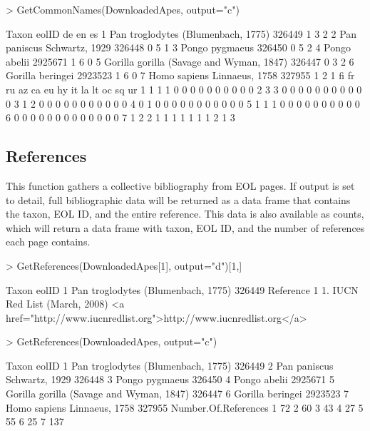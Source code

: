 \documentclass[12pt]{article}
\begin{document}
\begin{Schunk}
\begin{Sinput}
> GetCommonNames(DownloadedApes, output="c")
\end{Sinput}
\begin{Soutput}
                                     Taxon   eolID de en es
1       Pan troglodytes (Blumenbach, 1775)  326449  1  3  2
2              Pan paniscus Schwartz, 1929  326448  0  5  1
3                           Pongo pygmaeus  326450  0  5  2
4                             Pongo abelii 2925671  1  6  0
5 Gorilla gorilla (Savage and Wyman, 1847)  326447  0  3  2
6                         Gorilla beringei 2923523  1  6  0
7              Homo sapiens Linnaeus, 1758  327955  1  2  1
  fi fr ru az ca eu hy it la lt oc sq ur
1  1  1  1  0  0  0  0  0  0  0  0  0  0
2  3  3  0  0  0  0  0  0  0  0  0  0  0
3  1  2  0  0  0  0  0  0  0  0  0  0  0
4  0  1  0  0  0  0  0  0  0  0  0  0  0
5  1  1  1  0  0  0  0  0  0  0  0  0  0
6  0  0  0  0  0  0  0  0  0  0  0  0  0
7  1  2  2  1  1  1  1  1  1  1  2  1  3
\end{Soutput}
\end{Schunk}

\subsection{References}
This function gathers a collective bibliography from EOL pages. If output is set to detail, full bibliographic data will be returned as a data frame that contains the taxon, EOL ID, and the entire reference. This data is also available as counts, which will return a data frame with taxon, EOL ID, and the number of references each page contains. 

\begin{Schunk}
\begin{Sinput}
> GetReferences(DownloadedApes[1], output="d")[1,]
\end{Sinput}
\begin{Soutput}
                               Taxon  eolID
1 Pan troglodytes (Blumenbach, 1775) 326449
                                                                                            Reference
1 1. IUCN Red List  (March, 2008) <a href="http://www.iucnredlist.org">http://www.iucnredlist.org</a>
\end{Soutput}
\begin{Sinput}
> GetReferences(DownloadedApes, output="c")
\end{Sinput}
\begin{Soutput}
                                     Taxon   eolID
1       Pan troglodytes (Blumenbach, 1775)  326449
2              Pan paniscus Schwartz, 1929  326448
3                           Pongo pygmaeus  326450
4                             Pongo abelii 2925671
5 Gorilla gorilla (Savage and Wyman, 1847)  326447
6                         Gorilla beringei 2923523
7              Homo sapiens Linnaeus, 1758  327955
  Number.Of.References
1                   72
2                   60
3                   43
4                   27
5                   55
6                   25
7                  137
\end{Soutput}
\end{Schunk}
\end{document}

